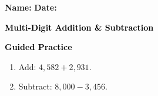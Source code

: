 \documentclass[12pt, letterpaper, fleqn]{article}
\begin{document}
\textbf{Name:} \underline{\hspace{5cm}}
\hfill
\textbf{Date:} \underline{\hspace{3cm}}\\

\begin{tcolorbox}[colback=customteal!20]
    \large\textcolor{black}{\textbf{Multi-Digit Addition \& Subtraction}}
\end{tcolorbox}
\newpage
\begin{tcolorbox}[colback=customteal!20]
    \large\textcolor{black}{\textbf{Guided Practice}}
\end{tcolorbox}
\begin{enumerate}[itemsep=3.5cm, leftmargin=0.6cm]
\item Add: $4,582 + 2,931$.
\vspace{3cm}
\item Subtract: $8,000 - 3,456$.
\end{enumerate}
\end{document}
